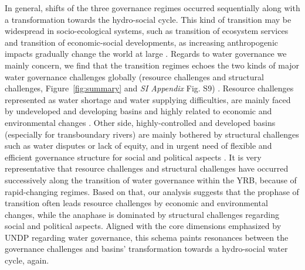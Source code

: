 \documentclass[9pt, twocolumn, twoside, lineno]{pnas-new}
\begin{document}
In general, shifts of the three governance regimes occurred sequentially along with a transformation towards the hydro-social cycle.
This kind of transition may be widespread in socio-ecological systems, such as transition of ecosystem services and transition of economic-social developments, as increasing anthropogenic impacts gradually change the world at large 
\cite{best2020,cummingLinkingEconomicGrowth2018,cummingImplicationsAgriculturalTransitions2014}.
Regards to water governance we mainly concern, we find that the transition regimes echoes the two kinds of major water governance challenges globally (resource challenges and structural challenges, Figure~\ref{fig:summary} and \textit{SI Appendix} Fig. S9)
\cite{singh2019,porcher2019}.
Resource challenges represented as water shortage and water supplying difficulties, are mainly faced by undeveloped and developing basins and highly related to economic and environmental changes
\cite{allan2019,florke2018,liu2012}. 
Other side, highly-controlled and developed basins (especially for transboundary rivers) are mainly bothered by structural challenges such as water disputes or lack of equity, and in urgent need of flexible and efficient governance structure for social and political aspects
\cite{kitroeff2020,roobavannan2017,unep-dhi2016}.
It is very representative that resource challenges and structural challenges have occurred successively along the transition of water governance within the YRB, because of rapid-changing regimes.
Based on that, our analysis suggests that the prophase of transition often leads resource challenges by economic and environmental changes, while the anaphase is dominated by structural challenges regarding social and political aspects.
Aligned with the core dimensions emphasized by UNDP regarding water governance, this schema paints resonances between the governance challenges and basins' transformation towards a hydro-social water cycle, again. 
\end{document}

